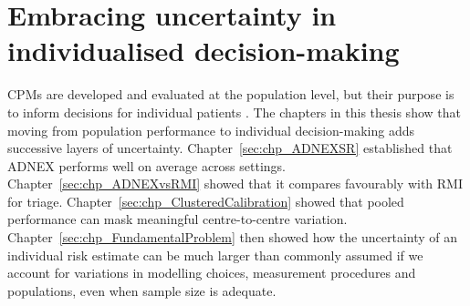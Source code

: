\section{Embracing uncertainty in individualised decision-making}

\glspl{CPM} are developed and evaluated at the population level, but their purpose is to inform decisions for individual patients \cite{steyerbergClinicalPredictionModels2009}. The chapters in this thesis show that moving from population performance to individual decision-making adds successive layers of uncertainty. Chapter~\ref{sec:chp_ADNEXSR} established that \gls{ADNEX} performs well on average across settings. Chapter~\ref{sec:chp_ADNEXvsRMI} showed that it compares favourably with \gls{RMI} for triage. Chapter~\ref{sec:chp_ClusteredCalibration} showed that pooled performance can mask meaningful centre-to-centre variation. Chapter~\ref{sec:chp_FundamentalProblem} then showed how the uncertainty of an individual risk estimate can be much larger than commonly assumed if we account for variations in modelling choices, measurement procedures and populations, even when sample size is adequate. 

